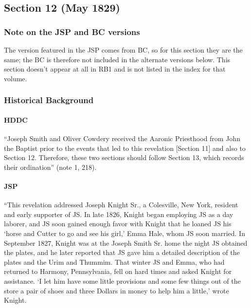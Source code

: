 \subsection{Section 12 (May 1829)}
	\label{DC12}
	
	\subsubsection{Note on the JSP and BC versions}
	
		The version featured in the JSP comes from BC, so for this section they are the same; the BC is therefore not included in the alternate versions below. This section doesn't appear at all in RB1 and is not listed in the index for that volume.
	
	\subsubsection{Historical Background}
		\label{DC12-HB}
		
		\paragraph{HDDC}
		
			``Joseph Smith and Oliver Cowdery received the Aaronic Priesthood from John the Baptist prior to the events that led to this revelation [Section 11] and also to Section 12. Therefore, these two sections should follow Section 13, which records their ordination'' (note 1, 218).
		
		\paragraph{JSP}
			
			``This revelation addressed Joseph Knight Sr., a Colesville, New York, resident and early supporter of JS. In late 1826, Knight began employing JS as a day laborer, and JS soon gained enough favor with Knight that he loaned JS his `horse and Cutter to go and see his girl,' Emma Hale, whom JS soon married. In September 1827, Knight was at the Joseph Smith Sr. home the night JS obtained the plates, and he later reported that JS gave him a detailed description of the plates and the Urim and Thummim. That winter JS and Emma, who had returned to Harmony, Pennsylvania, fell on hard times and asked Knight for assistance. `I let him have some little provisions and some few things out of the store a pair of shoes and three Dollars in money to help him a little,' wrote Knight.
			
